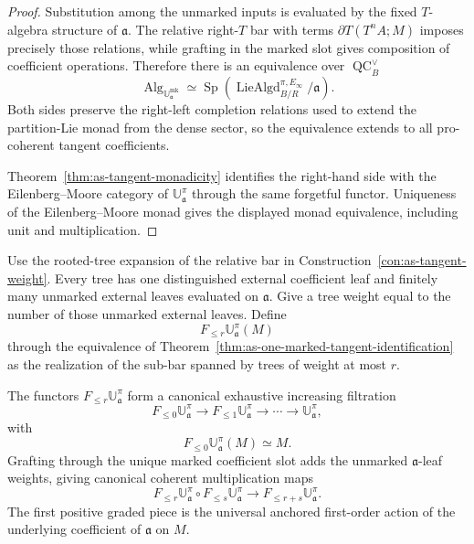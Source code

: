 \begin{proof}
Substitution among the unmarked inputs is evaluated by the fixed $T$-algebra
structure of $\mathfrak a$.  The relative right-$T$ bar with terms
$\partial T(T^nA;M)$ imposes precisely those relations, while grafting in the
marked slot gives composition of coefficient operations.  Therefore there is
an equivalence over
$\operatorname{QC}^{\vee}_B$
\[
    \operatorname{Alg}_{\mathbb U_{\mathfrak a}^{\mathrm{mk}}}
    \simeq
    \operatorname{Sp}
    \left(
        \operatorname{LieAlgd}^{\pi,E_\infty}_{B/R}/\mathfrak a
    \right).
\]
Both sides preserve the right-left completion relations used to extend the
partition-Lie monad from the dense sector, so the equivalence extends to all
pro-coherent tangent coefficients.

Theorem~\ref{thm:as-tangent-monadicity} identifies the right-hand side with
the Eilenberg--Moore category of $\mathbb U_{\mathfrak a}^{\pi}$ through the
same forgetful functor.  Uniqueness of the Eilenberg--Moore monad gives the
displayed monad equivalence, including unit and multiplication.
\end{proof}

\begin{construction}
\label{con:as-one-marked-tangent-filtration}
Use the rooted-tree expansion of the relative bar in
Construction~\ref{con:as-tangent-weight}.  Every tree has one distinguished
external coefficient leaf and finitely many unmarked external leaves evaluated
on $\mathfrak a$.  Give a tree weight equal to the number of those unmarked
external leaves.  Define
\[
\boxed{
    F_{\leq r}\mathbb U_{\mathfrak a}^{\pi}(M)
}
\]
through the equivalence of
Theorem~\ref{thm:as-one-marked-tangent-identification} as the realization of
the sub-bar spanned by trees of weight at most $r$.
\end{construction}

\begin{theorem}
\label{thm:as-filtered-enveloping-monad}
The functors $F_{\leq r}\mathbb U_{\mathfrak a}^{\pi}$ form a canonical
exhaustive increasing filtration
\[
    F_{\leq0}\mathbb U_{\mathfrak a}^{\pi}
    \longrightarrow
    F_{\leq1}\mathbb U_{\mathfrak a}^{\pi}
    \longrightarrow\cdots\longrightarrow
    \mathbb U_{\mathfrak a}^{\pi},
\]
with
\[
\boxed{
    F_{\leq0}\mathbb U_{\mathfrak a}^{\pi}(M)\simeq M.
}
\]
Grafting through the unique marked coefficient slot adds the unmarked
$\mathfrak a$-leaf weights, giving canonical coherent multiplication maps
\[
\boxed{
    F_{\leq r}\mathbb U_{\mathfrak a}^{\pi}
    \circ
    F_{\leq s}\mathbb U_{\mathfrak a}^{\pi}
    \longrightarrow
    F_{\leq r+s}\mathbb U_{\mathfrak a}^{\pi}.
}
\]
The first positive graded piece is the universal anchored first-order action of
the underlying coefficient of $\mathfrak a$ on $M$.
\end{theorem}

